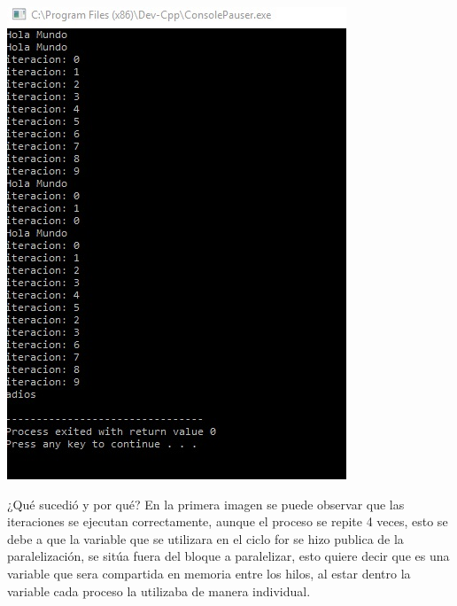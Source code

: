 \documentclass[12pt,letterpaper]{article}
\begin{document}
\begin{flushleft}
\includegraphics[scale=.8]{ejercicio31.jpg} 

\end{flushleft}
¿Qué sucedió y por qué? En la primera imagen se puede observar que las iteraciones se ejecutan correctamente, aunque el proceso se repite 4 veces, esto se debe a que la variable que se utilizara en el ciclo for se hizo publica de la paralelización, se sitúa fuera del bloque a paralelizar, esto quiere decir que es una variable que sera compartida en memoria entre los hilos, al estar dentro la variable cada proceso la utilizaba de manera individual.
\end{document}
